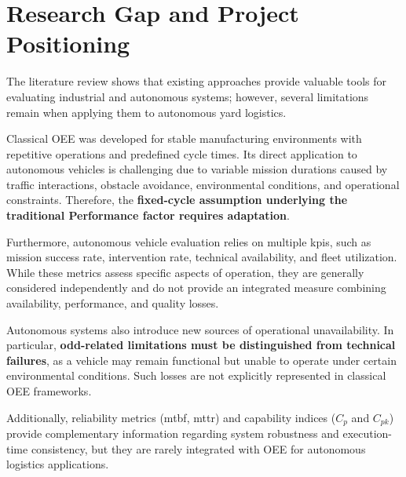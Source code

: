 \section{Research Gap and Project Positioning}

The literature review shows that existing approaches provide valuable tools for evaluating industrial and autonomous systems; however, several limitations remain when applying them to autonomous yard logistics.

Classical OEE was developed for stable manufacturing environments with repetitive operations and predefined cycle times. Its direct application to autonomous vehicles is challenging due to variable mission durations caused by traffic interactions, obstacle avoidance, environmental conditions, and operational constraints. Therefore, the \textbf{fixed-cycle assumption underlying the traditional Performance factor requires adaptation}.

Furthermore, autonomous vehicle evaluation relies on multiple \glspl{kpi}, such as mission success rate, intervention rate, technical availability, and fleet utilization. While these metrics assess specific aspects of operation, they are generally considered independently and do not provide an integrated measure combining availability, performance, and quality losses.

Autonomous systems also introduce new sources of operational unavailability. In particular, \textbf{\gls{odd}-related limitations must be distinguished from technical failures}, as a vehicle may remain functional but unable to operate under certain environmental conditions. Such losses are not explicitly represented in classical OEE frameworks.

Additionally, reliability metrics (\gls{mtbf}, \gls{mttr}) and capability indices ($C_p$ and $C_{pk}$) provide complementary information regarding system robustness and execution-time consistency, but they are rarely integrated with OEE for autonomous logistics applications.



%


